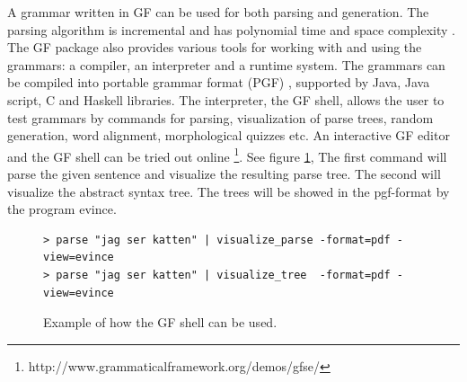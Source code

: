 \documentclass{report}
\begin{document}
A grammar written in GF can be used for both parsing and generation.
The parsing algorithm is incremental and has polynomial time and space
complexity \cite{gfMech}. 
The GF package also provides various tools for working with and using the grammars:
a compiler, an interpreter and a runtime system.
The grammars can be compiled into portable grammar format (PGF) \cite{pgf},
supported by %
Java, Java script, C and Haskell libraries. 
The interpreter, the GF shell, allows
the user to test grammars by commands for parsing, visualization of parse trees,
random generation, word alignment, morphological quizzes etc.
An interactive GF editor and the GF shell can be tried out online 
\footnote{http://www.grammaticalframework.org/demos/gfse/}. See figure \ref{fig:shell},
 The first command will parse the given
sentence and visualize the resulting parse tree. The second will visualize the 
abstract syntax tree. The trees will be showed in the pgf-format by the program evince.
\begin{figure}[h]
\begin{verbatim} 
> parse "jag ser katten" | visualize_parse -format=pdf -view=evince
> parse "jag ser katten" | visualize_tree  -format=pdf -view=evince
\end{verbatim}
\caption{Example of how the GF shell can be used.}\label{fig:shellvp}
\label{fig:shell}
\end{figure}
\end{document}
